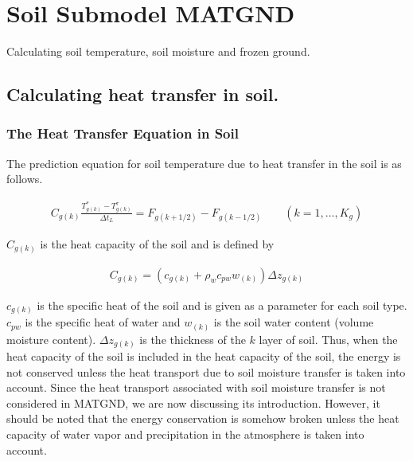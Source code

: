 \hypertarget{soil-submodel-matgnd}{%
\section{Soil Submodel MATGND}\label{soil-submodel-matgnd}}

Calculating soil temperature, soil moisture and frozen ground.

\hypertarget{calculating-heat-transfer-in-soil.}{%
\subsection{Calculating heat transfer in
soil.}\label{calculating-heat-transfer-in-soil.}}

\hypertarget{the-heat-transfer-equation-in-soil}{%
\subsubsection{The Heat Transfer Equation in
Soil}\label{the-heat-transfer-equation-in-soil}}

The prediction equation for soil temperature due to heat transfer in the
soil is as follows.

\begin{eqnarray}
C_{g(k)} \frac{T_{g(k)}^* - T_{g(k)}^{\tau}}{\Delta t_L} = F_{g(k+1/2)} - F_{g(k-1/2)}
\qquad (k=1,\ldots,K_{g})
\end{eqnarray}

\(C_{g(k)}\) is the heat capacity of the soil and is defined by

\begin{eqnarray}
 C_{g(k)} = ( c_{g(k)} + \rho_w c_{pw} w_{(k)} ) \Delta z_{g(k)}
\end{eqnarray}

\(c_{g(k)}\) is the specific heat of the soil and is given as a
parameter for each soil type. \(c_{pw}\) is the specific heat of water
and \(w_{(k)}\) is the soil water content (volume moisture content).
\(\Delta z_{g(k)}\) is the thickness of the \(k\) layer of soil. Thus,
when the heat capacity of the soil is included in the heat capacity of
the soil, the energy is not conserved unless the heat transport due to
soil moisture transfer is taken into account. Since the heat transport
associated with soil moisture transfer is not considered in MATGND, we
are now discussing its introduction. However, it should be noted that
the energy conservation is somehow broken unless the heat capacity of
water vapor and precipitation in the atmosphere is taken into account.

